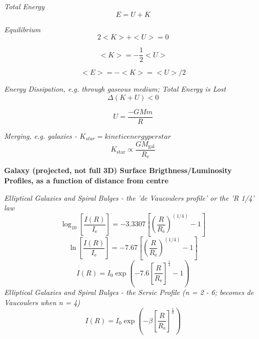 \documentclass{spy}
\begin{document}
\textit {Total Energy}
\begin{equation}
E = U + K
\end{equation}

\textit {Equilibrium}
\begin{equation}
2 <K> + <U> = 0
\end{equation}

\begin{equation}
<K> = -\frac {1}{2} <U>
\end{equation}

\begin{equation}
<E> = - <K> = <U> / 2
\end{equation}

\textit {Energy Dissipation, e.g. through gaseous medium; Total Energy is Lost}
\begin{equation}
\Delta \left(K + U\right) < 0
\end{equation}

\begin{equation}
U = \frac {-GMm}{R}
\end{equation}

\textit {Merging, e.g. galaxies - \(K_{star} = kinetic energy per star\)}
\begin{equation}
K_\mathrm{star} \propto \frac {G M_\mathrm{gal}}{R_\mathrm{e}}
\end{equation}


\textbf {Galaxy (projected, not full 3D) Surface Brigthness/Luminosity Profiles, as a function of distance from centre}

\textit {Elliptical Galaxies and Spiral Bulges - the 'de Vaucoulers profile' or the 'R 1/4' law}
\begin{equation}
\log_\mathrm{10} \left[ \frac {I(R)}{I_\mathrm{e}} \right] = - 3.3307 \left[ \left( \frac {R}{R_\mathrm{e}} \right)^{(1/4)} - 1 \right]
\end{equation}
\begin{equation}
\ln \left[ \frac {I(R)}{I_\mathrm{e}} \right] = - 7.67 \left[ \left( \frac {R}{R_\mathrm{e}} \right)^{(1/4)} - 1 \right]
\end{equation}
\begin{equation}
I(R) = I_0 \exp\left(-7.6 \left[\frac {R}{R_\mathrm{e}} \right]^ \frac {1}{4} -1 \right)
\end{equation}
\textit {Elliptical Galaxies and Spiral Bulges - the Sersic Profile (n = 2 - 6; becomes de Vaucoulers when n = 4)}
\begin{equation}
I(R) = I_0 \exp\left(-\beta \left[\frac {R}{R_\mathrm{e}} \right]^ \frac {1}{n}\right)
\end{equation}
\end{document}
